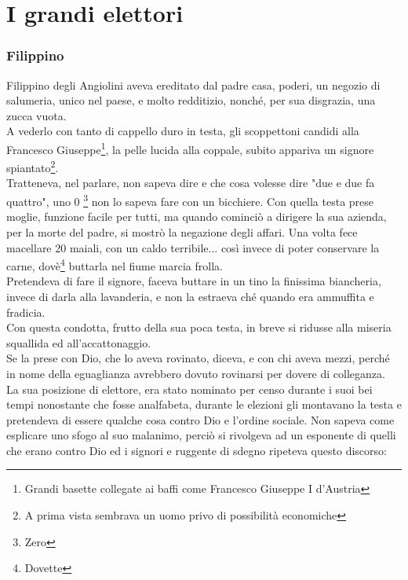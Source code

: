 
\chapter{I grandi elettori}
\subsection{Filippino}
Filippino degli Angiolini aveva ereditato dal padre casa, poderi, un negozio di salumeria, unico nel paese, e molto redditizio, nonché, per sua disgrazia, una zucca vuota.\\
A vederlo con tanto di cappello duro in testa, gli scoppettoni candidi alla Francesco Giuseppe\footnote{Grandi basette collegate ai baffi come Francesco Giuseppe I d'Austria}, la pelle lucida alla coppale, subito appariva un signore spiantato\footnote{A prima vista sembrava un uomo privo di possibilità economiche}.\\
Tratteneva, nel parlare, non sapeva dire e che cosa volesse dire "due e due fa quattro", uno 0 \footnote{Zero} non lo sapeva fare con un bicchiere. Con quella testa prese moglie, funzione facile per tutti, ma quando cominciò a dirigere la sua azienda, per la morte del padre, si mostrò la negazione degli affari. Una volta fece macellare 20 maiali, con un caldo terribile... così invece di poter conservare la carne, dovè\footnote{Dovette} buttarla nel fiume marcia frolla. \\
Pretendeva di fare il signore, faceva buttare in un tino la finissima biancheria, invece di darla alla lavanderia, e non la estraeva ché quando era ammuffita e fradicia.\\
Con questa condotta, frutto della sua poca testa, in breve si ridusse alla miseria squallida ed all'accattonaggio.\\
Se la prese con Dio, che lo aveva rovinato, diceva, e con chi aveva mezzi, perché in nome della eguaglianza avrebbero dovuto rovinarsi per dovere di colleganza.\\
La sua posizione di elettore, era stato nominato per censo durante i suoi bei tempi nonostante che fosse analfabeta, durante le elezioni gli montavano la testa e pretendeva di essere qualche cosa contro Dio e l'ordine sociale. Non sapeva come esplicare uno sfogo al suo malanimo, perciò si rivolgeva ad un esponente di quelli che erano contro Dio ed i signori e ruggente di sdegno ripeteva questo discorso:
